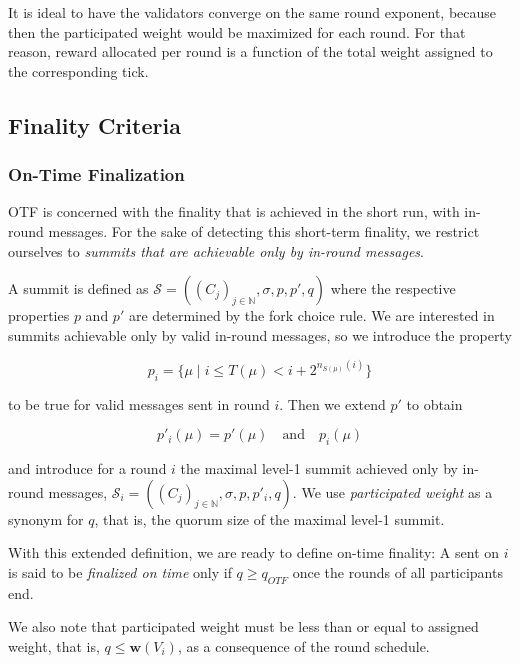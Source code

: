 It is ideal to have the validators converge on the same round exponent, because then the participated weight would be maximized for each round. For that reason, reward allocated per round is a function of the total weight assigned to the corresponding tick.

\subsection{Finality Criteria}
\label{sec:finality-criteria}

\subsubsection*{On-Time Finalization}
\label{sec:on-time-finalization}

OTF is concerned with the finality that is achieved in the short run, with in-round messages. For the sake of detecting this short-term finality, we restrict ourselves to \emph{summits that are achievable only by in-round messages}.

A summit is defined as $\mathcal{S}=((C_j)_{j\in\mathbb{N}}, \sigma,p,p',q)$ where the respective properties $p$ and $p'$ are determined by the fork choice rule. We are interested in summits achievable only by valid in-round messages, so we introduce the property

\begin{equation}
  p_i = \{\mu \mid i \leq T(\mu)< i+2^{n_{S(\mu) }(i)}\}
\end{equation}

to be true for valid messages sent in round $i$. Then we extend $p'$ to obtain

\begin{equation}
  p'_{i}(\mu) = p'(\mu)\quad\text{and}\quad p_{i}(\mu)
\end{equation}

and introduce for a round $i$ the maximal level-1 summit achieved only by in-round messages, $\mathcal{S}_i=((C_j)_{j\in\mathbb{N}}, \sigma,p,p'_{i},q)$. We use \emph{participated weight} as a synonym for $q$, that is, the quorum size of the maximal level-1 summit.

With this extended definition, we are ready to define on-time finality: A \PROP sent on $i$ is said to be \emph{finalized on time} only if $q \geq q_{OTF}$ once the rounds of all participants end.

We also note that participated weight must be less than or equal to assigned weight, that is, $q \leq \boldsymbol{w}(V_i)$, as a consequence of the round schedule.

